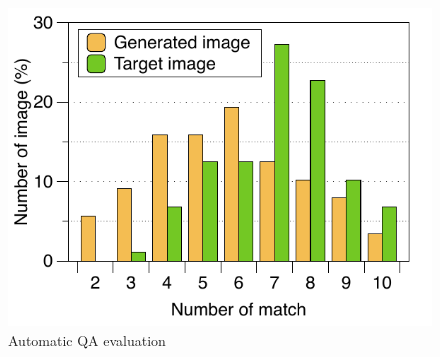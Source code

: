 
\begin{figure}
  \vspace{-0.1in}
  \begin{center}
    \includegraphics[width=0.96\linewidth]{figure_folder/qa.pdf}
  \end{center}
  \vspace{-0.22in}
  \caption{\small Automatic QA evaluation}
  \label{figure_qa}
\end{figure}